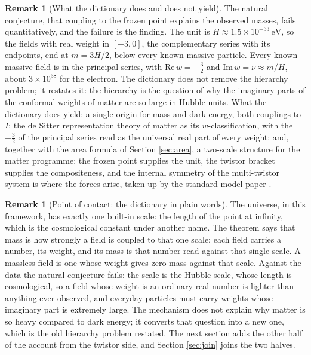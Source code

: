 \documentclass[11pt]{article}
\theoremstyle{definition}
\newtheorem{remark}[theorem]{Remark}
\begin{document}
\begin{remark}[What the dictionary does and does not yield]\label{rem:hierarchy}
The natural conjecture, that coupling to the frozen point explains the observed masses, fails quantitatively, and the failure is the finding. The unit is $H \approx 1.5 \times 10^{-33}\,\mathrm{eV}$, so the fields with real weight in $[-3,0]$, the complementary series with its endpoints, end at $m = 3H/2$, below every known massive particle. Every known massive field is in the principal series, with $\mathrm{Re}\,w = -\tfrac32$ and $\mathrm{Im}\,w = \nu \approx m/H$, about $3 \times 10^{38}$ for the electron. The dictionary does not remove the hierarchy problem; it restates it: the hierarchy is the question of why the imaginary parts of the conformal weights of matter are so large in Hubble units. What the dictionary does yield: a single origin for mass and dark energy, both couplings to $I$; the de Sitter representation theory of matter as its $w$-classification, with the $-\tfrac32$ of the principal series read as the universal real part of every weight; and, together with the area formula of Section \ref{sec:area}, a two-scale structure for the matter programme: the frozen point supplies the unit, the twistor bracket supplies the compositeness, and the internal symmetry of the multi-twistor system is where the forces arise, taken up by the standard-model paper \cite{ButlerT12}.
\end{remark}

\begin{remark}[Point of contact: the dictionary in plain words]\label{rem:plain}
The universe, in this framework, has exactly one built-in scale: the length of the point at infinity, which is the cosmological constant under another name. The theorem says that mass is how strongly a field is coupled to that one scale: each field carries a number, its weight, and its mass is that number read against that single scale. A massless field is one whose weight gives zero mass against that scale. Against the data the natural conjecture fails: the scale is the Hubble scale, whose length is cosmological, so a field whose weight is an ordinary real number is lighter than anything ever observed, and everyday particles must carry weights whose imaginary part is extremely large. The mechanism does not explain why matter is so heavy compared to dark energy; it converts that question into a new one, which is the old hierarchy problem restated. The next section adds the other half of the account from the twistor side, and Section \ref{sec:join} joins the two halves.
\end{remark}
\end{document}
